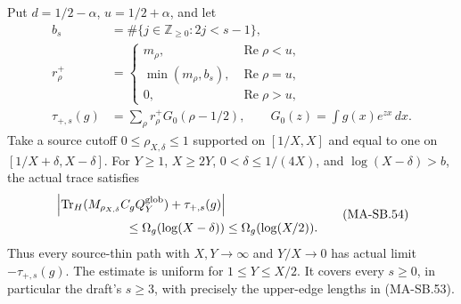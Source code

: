 Put $d=1/2-\alpha$, $u=1/2+\alpha$, and let
\[
 \begin{aligned}
 b_s&=\#\{j\in\mathbb Z_{\ge0}:2j<s-1\},\\
 r_\rho^+&=
 \begin{cases}
 m_\rho,&\operatorname{Re}\rho<u,\\
 \min(m_\rho,b_s),&\operatorname{Re}\rho=u,\\
 0,&\operatorname{Re}\rho>u,
 \end{cases}\\
 \tau_{+,s}(g)&=\sum_\rho r_\rho^+G_0(\rho-1/2),\qquad
 G_0(z)=\int g(x)e^{zx}\,dx.
 \end{aligned}
 \tag{MA-SB.53}
\]
Take a source cutoff $0\le\rho_{X,\delta}\le1$
supported on $[1/X,X]$ and equal to one on
$[1/X+\delta,X-\delta]$.
For
$Y\ge1$, $X\ge2Y$, $0<\delta\le1/(4X)$, and
$\log(X-\delta)>b$, the actual trace satisfies
\[
 \begin{split}
 &\left|\operatorname{Tr}_H
       (M_{\rho_{X,\delta}}C_gQ_Y^{\rm glob})
                     +\tau_{+,s}(g)\right|\\
 &\hspace{20mm}\le\Omega_g(\log(X-\delta))
                         \le\Omega_g(\log(X/2)).
 \end{split}
 \tag{MA-SB.54}
\]
Thus every source-thin path with $X,Y\to\infty$ and
$Y/X\to0$ has actual limit $-\tau_{+,s}(g)$.
The estimate is uniform for $1\le Y\le X/2$.
It covers every $s\ge0$, in particular the draft's
$s\ge3$, with precisely the upper-edge lengths
in (MA-SB.53).

